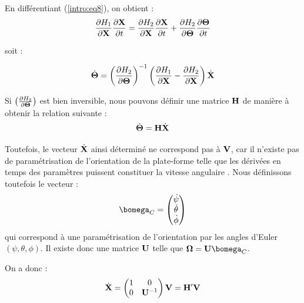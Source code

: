 En différentiant (\ref{intro:eq8}), on obtient :
\begin{equation}
\frac{\partial H_1}{\partial {\bf X}} \frac{\partial {\bf X}}{\partial t} 
=  \frac{\partial H_2}{\partial {\bf X}} \frac{\partial {\bf X}}{\partial t} + 
\frac{\partial H_2}{\partial {\bf \Theta}} \frac{\partial {\bf 
\Theta}}{\partial t}
\label{intro:eq9}
\end{equation}

soit :

\begin{equation}
\dot {\bf \Theta} = \left ( \frac{\partial H_2}{\partial {\bf \Theta}} \right 
)^{-1} \left (\frac{\partial H_1}{\partial {\bf X}} - \frac{\partial 
H_2}{\partial {\bf X}} \right ) \dot {\bf X}
\label{intro:eq10}
\end{equation}

Si $\left ( \frac{\partial H_2}{\partial {\bf \Theta}} \right )$ est bien 
inversible, nous pouvons définir une matrice ${\bf H}$ de manière à 
obtenir la relation suivante :
\begin{equation}
\dot {\bf \Theta} = {\bf H} \dot {\bf X}
\label{intro:eq11}
\end{equation}

Toutefois, le vecteur $\dot {\bf X}$ ainsi d\'etermin\'e ne correspond pas \`a 
$\bf V$, car il n'existe pas de paramétrisation de l'orientation de la 
plate-forme telle que les dérivées en temps des paramètres puissent constituer 
la vitesse angulaire \cite{merlet2007jacobian}. Nous définissons toutefois le 
vecteur :
\begin{equation}
\bomega_C = \left ( \begin{matrix}
                \dot \psi \\
                \dot \theta \\
                \dot \phi       
               \end{matrix} \right )
\label{intro:eq11c}
\end{equation}
qui correspond à une paramétrisation de l'orientation par les angles d'Euler 
$(\psi, \theta, \phi)$. Il existe donc une matrice $\bf U$ telle que ${\bf 
\Omega} = {\bf U} {\bomega}_C$.

On a donc :
\begin{equation}
\dot {\bf X} = \left ( \begin{matrix}
                1 & 0 \\
                0 & {\bf U}^{-1}
               \end{matrix} \right ) {\bf V} = {\bf H}' {\bf V}
\label{intro:eq11c2}
\end{equation}

